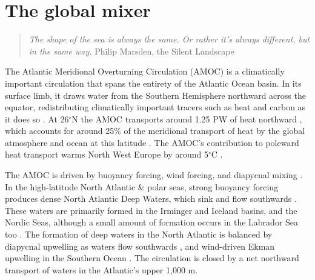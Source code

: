 \chapter{The global mixer}
\label{chap:1}

\begin{quote}
\textit{The shape of the sea is always the same. Or rather it's always different, but in the same way.}
\newline Philip Marsden, the Silent Landscape
\end{quote}

The Atlantic Meridional Overturning Circulation (AMOC) is a climatically important circulation that spans the entirety of the Atlantic Ocean basin. In its surface limb, it draws water from the Southern Hemisphere northward across the equator, redistributing climatically important tracers such as heat and carbon as it does so \citep{Buckley2015}. At 26$^\circ$N the AMOC transports around 1.25 PW of heat northward \citep{Bryden2020}, which accounts for around 25\% of the meridional transport of heat by the global atmosphere and ocean at this latitude \citep{Srokosz2012}. The AMOC's contribution to poleward heat transport warms North West Europe by around 5$^\circ$C \citep{Jackson2015}.

The AMOC is driven by buoyancy forcing, wind forcing, and diapycnal mixing \citep[e.g.][]{Munk1998, Johnson2019}.
In the high-latitude North Atlantic \& polar seas, strong buoyancy forcing produces dense North Atlantic Deep Waters, which sink and flow southwards \citep[e.g.][]{Marshall1999}. These waters are primarily formed in the Irminger and Iceland basins, and the Nordic Seas, although a small amount of formation occurs in the Labrador Sea too \citep{Lozier2019}. The formation of deep waters in the North Atlantic is balanced by diapycnal upwelling as waters flow southwards \citep{Munk1966, Ferrari2016, Mashayek2017, McDougall2017, Callies2018, Cimoli2022}, and wind-driven Ekman upwelling in the Southern Ocean \citep{Gnanadesikan1999, Marshall2012}. The circulation is closed by a net northward transport of waters in the Atlantic's upper 1,000 m.


